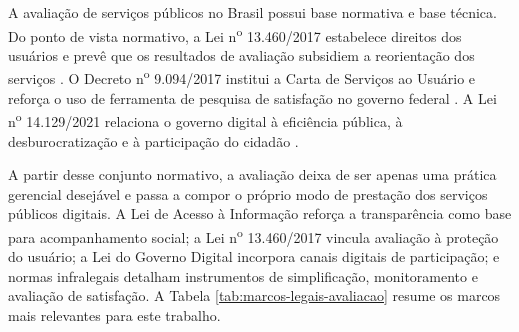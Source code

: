 A avaliação de serviços públicos no Brasil possui base normativa e base técnica.
Do ponto de vista normativo, a Lei n\textsuperscript{o} 13.460/2017 estabelece
direitos dos usuários e prevê que os resultados de avaliação subsidiem a
reorientação dos serviços \cite{brasil2017lei13460}. O Decreto
n\textsuperscript{o} 9.094/2017 institui a Carta de Serviços ao Usuário e reforça
o uso de ferramenta de pesquisa de satisfação no governo federal
\cite{brasil2017decreto9094}. A Lei n\textsuperscript{o} 14.129/2021 relaciona o
governo digital à eficiência pública, à desburocratização e à participação do
cidadão \cite{brasil2021lei14129}.

A partir desse conjunto normativo, a avaliação deixa de ser apenas uma prática
gerencial desejável e passa a compor o próprio modo de prestação dos serviços
públicos digitais. A Lei de Acesso à Informação reforça a transparência como
base para acompanhamento social; a Lei n\textsuperscript{o} 13.460/2017 vincula
avaliação à proteção do usuário; a Lei do Governo Digital incorpora canais
digitais de participação; e normas infralegais detalham instrumentos de
simplificação, monitoramento e avaliação de satisfação. A Tabela
\ref{tab:marcos-legais-avaliacao} resume os marcos mais relevantes para este
trabalho.

